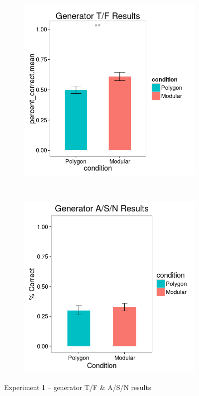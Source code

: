 \documentclass[man,mask,10pt]{apa6}
\begin{document}
\begin{figure}[H]
\centering
\begin{subfigure}[c]{0.3\textwidth}
\centering
\includegraphics[width=\textwidth]{figures/1/gen_TF_r.png}
\end{subfigure}
~
\begin{subfigure}[c]{0.3\textwidth}
\centering
\includegraphics[width=\textwidth]{figures/1/gen_ASN_r.png}
\end{subfigure}
\caption{Experiment 1 -- generator T/F \& A/S/N results}
\label{ex1_TFASN}
\end{figure}\noindent 
\end{document}
